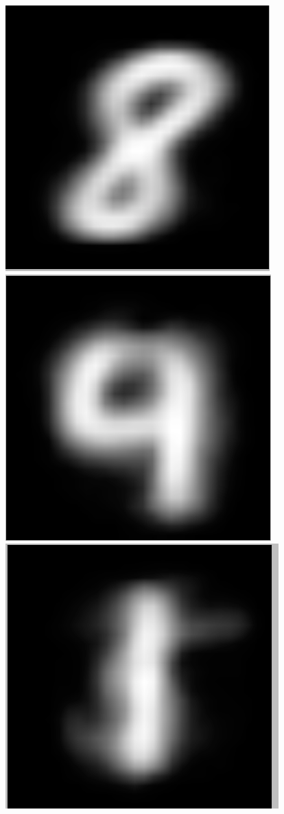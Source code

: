 \documentclass[submit]{harvardml}
\begin{document}
\begin{figure}[h]
	\includegraphics[scale=0.1]{./m1/6}
	\includegraphics[scale=0.1]{./m1/7}
	\includegraphics[scale=0.1]{./m1/8}

\end{figure}
\end{document}
